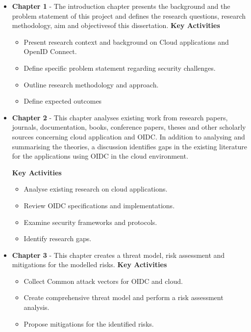 \begin{itemize}
    \item \textbf{Chapter 1} - The introduction chapter presents the background and the problem statement of this project and defines the research questions, research methodology, aim and objectivesof this dissertation.\newline
    \textbf{Key Activities}
    \begin{itemize}
        \item Present research context and background on Cloud applications and OpenID Connect.
        \item Define specific problem statement regarding security challenges.
        \item Outline research methodology and approach.
        \item Define expected outcomes
    \end{itemize}

    \item \textbf{Chapter 2} - This chapter analyses existing work from research papers, journals, documentation, books, conference papers, theses and other scholarly sources concerning cloud application and OIDC.
    In addition to analysing and summarising the theories, a discussion identifies gaps in the existing literature for the applications using OIDC in the cloud environment.\newline

    \textbf{Key Activities}
    \begin{itemize}
        \item Analyse existing research on cloud applications.
        \item Review OIDC specifications and implementations.
        \item Examine security frameworks and protocols.
        \item Identify research gaps.
    \end{itemize}
    
    \item \textbf{Chapter 3} - This chapter creates a threat model, risk assessment and mitigations for the modelled risks. \newline
    \textbf{Key Activities}
    \begin{itemize}
        \item Collect Common attack vectors for OIDC and cloud.
        \item Create comprehensive threat model and perform a risk assessment analysis.
        \item Propose mitigations for the identified risks.
    \end{itemize}
    

\end{itemize}

